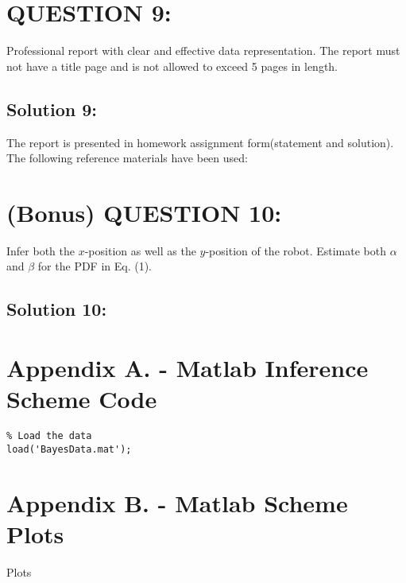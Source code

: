 \documentclass[a4paper,11pt]{article}
\begin{document}
\section{QUESTION 9:}
Professional report with clear and effective data representation. The report must not have
a title page and is not allowed to exceed 5 pages in length.
\subsection{Solution 9:}
The report is presented in homework assignment form(statement and solution). The following reference materials have been used: \cite{manuf}

\section{(Bonus) QUESTION 10:}
Infer both the $x$-position as well as the $y$-position of the robot. Estimate both $\alpha$ and $\beta$ for the PDF in Eq. (1).
\subsection*{Solution 10:}






\newpage
\appendix

\makeatother
\section{Appendix A. - Matlab Inference Scheme Code}
\begin{lstlisting}
% Load the data
load('BayesData.mat');
\end{lstlisting}

\newpage
\section{Appendix B. - Matlab Scheme Plots}
	Plots
\end{document}
